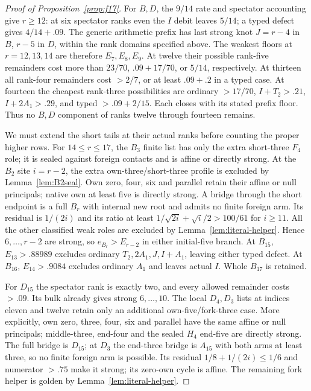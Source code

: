 \documentclass[11pt]{article}
\begin{document}
\begin{proof}[Proof of Proposition~\ref{prop:f17}]
For $B,D$, the $9/14$ rate and spectator accounting give $r\ge12$:
at six spectator ranks even the $I$ debit leaves $5/14$;
a typed defect gives $4/14+.09$. The generic arithmetic prefix
has last strong knot $J=r-4$ in $B$, $r-5$ in $D$, within the
rank domains specified above. The weakest floors at $r=12,13,14$
are therefore $E_7,E_8,E_9$.
At twelve their possible rank-five remainders cost more than
$23/70$, $.09+17/70$, or $5/14$, respectively.
At thirteen all rank-four remainders cost $>2/7$, or at least
$.09+.2$ in a typed case.
At fourteen the cheapest rank-three possibilities are ordinary
$>17/70$, $I+T_2>.21$, $I+2A_1>.29$, and
typed $>.09+2/15$. Each closes with its stated prefix floor.
Thus no $B,D$ component of ranks twelve through fourteen remains.

We must extend the short tails at their actual ranks before counting
the proper higher rows. For $14\le r\le17$, the $B_3$ finite list
has only the extra short-three $F_4$ role; it is sealed against foreign
contacts and is affine or directly strong. At the $B_2$ site $i=r-2$,
the extra own-three/short-three profile is excluded by
Lemma~\ref{lem:B2seal}. Own zero, four, six and parallel retain
their affine or null principals; native own at least five is directly
strong. A bridge through the short endpoint is a full $B_r$ with
internal new root and admits no finite foreign arm. Its residual is
$1/(2i)$ and its ratio at least
$1/\sqrt{2i}+\sqrt i/2>100/61$ for $i\ge11$.
All the other classified weak roles are excluded by
Lemma~\ref{lem:literal-helper}. Hence $6,\ldots,r-2$ are strong,
so $e_{B_r}>E_{r-2}$ in either initial-five branch.
At $B_{15}$, $E_{13}>.88989$ excludes ordinary $T_2,2A_1,J,I+A_1$,
leaving either typed defect. At $B_{16}$, $E_{14}>.9084$ excludes
ordinary $A_1$ and leaves actual $I$. Whole $B_{17}$ is retained.

For $D_{15}$ the spectator rank is exactly two, and every allowed
remainder costs $>.09$. Its bulk already gives strong $6,\ldots,10$.
The local $D_4,D_3$ lists at indices eleven and twelve retain only
an additional own-five/fork-three case. More explicitly, own zero,
three, four, six and parallel have the same affine or null principals;
middle-three, end-four and the sealed $H_4$ end-five are directly
strong. The full bridge is $D_{15}$; at $D_3$ the end-three bridge
is $A_{15}$ with both arms at least three, so no finite foreign arm
is possible. Its residual $1/8+1/(2i)\le1/6$ and numerator $>.75$
make it strong; its zero-own cycle is affine.
The remaining fork helper is golden by
Lemma~\ref{lem:literal-helper}.


\end{proof}
\end{document}
